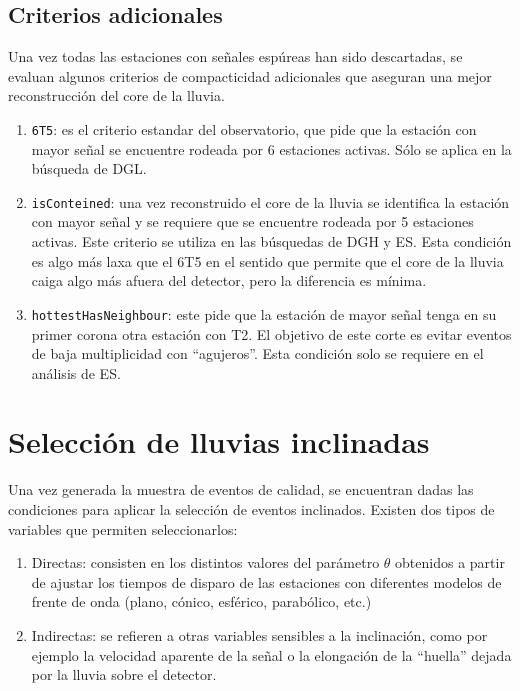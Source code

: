	
	\subsection{Criterios adicionales}
	
	Una vez todas las estaciones con señales espúreas han sido descartadas, se evaluan algunos criterios de compacticidad adicionales que aseguran una mejor reconstrucción del core de la lluvia.
	
	\begin{enumerate}
	 \item \texttt{6T5}: es el criterio estandar del observatorio, que pide que la estación con mayor señal se encuentre rodeada por 6 estaciones activas. Sólo se aplica en la búsqueda de DGL.
	 \item \texttt{isConteined}: una vez reconstruido el core de la lluvia se identifica la estación con mayor señal y se requiere que se encuentre rodeada por 5 estaciones activas. Este criterio se utiliza en las búsquedas de DGH y ES. Esta condición es algo más laxa que el 6T5 en el sentido que permite que el core de la lluvia caiga algo más afuera del detector, pero la diferencia es mínima.
	 \item \texttt{hottestHasNeighbour}: este pide que la estación de mayor señal tenga en su primer corona otra estación con T2. El objetivo de este corte es evitar eventos de baja multiplicidad con ``agujeros''. Esta condición solo se requiere en el análisis de ES.
	\end{enumerate}
	
\section{Selecci\'on de lluvias inclinadas}

Una vez generada la muestra de eventos de calidad, se encuentran dadas las condiciones para aplicar la selección de eventos inclinados.
Existen dos tipos de variables que permiten seleccionarlos:
\begin{enumerate}
 \item Directas: consisten en los distintos valores del parámetro $\theta$ obtenidos a partir de ajustar los tiempos de disparo de las estaciones con diferentes modelos de frente de onda (plano, cónico, esférico, parabólico, etc.)
 \item Indirectas: se refieren a otras variables sensibles a la inclinación, como por ejemplo la velocidad aparente de la señal o la elongación de la ``huella'' dejada por la lluvia sobre el detector.
\end{enumerate}
	
